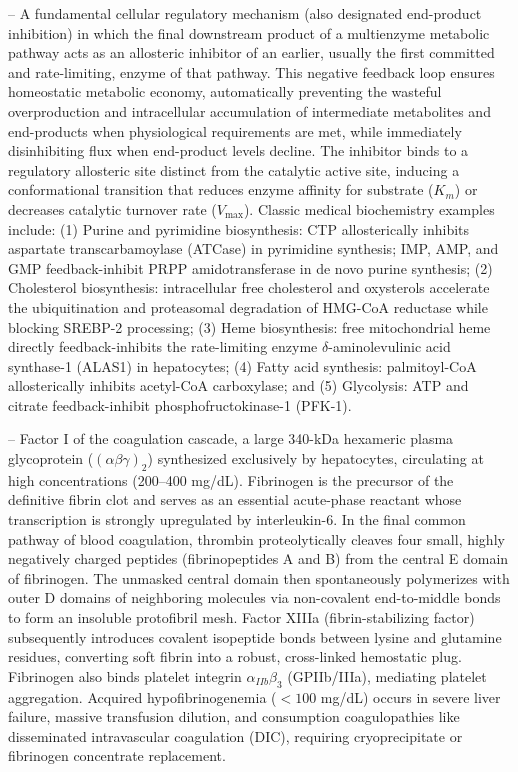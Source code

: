 -- A fundamental cellular regulatory mechanism (also designated end-product inhibition) in which the final downstream product of a multienzyme metabolic pathway acts as an allosteric inhibitor of an earlier, usually the first committed and rate-limiting, enzyme of that pathway. This negative feedback loop ensures homeostatic metabolic economy, automatically preventing the wasteful overproduction and intracellular accumulation of intermediate metabolites and end-products when physiological requirements are met, while immediately disinhibiting flux when end-product levels decline. The inhibitor binds to a regulatory allosteric site distinct from the catalytic active site, inducing a conformational transition that reduces enzyme affinity for substrate ($K_m$) or decreases catalytic turnover rate ($V_{\max}$). Classic medical biochemistry examples include: (1) Purine and pyrimidine biosynthesis: CTP allosterically inhibits aspartate transcarbamoylase (ATCase) in pyrimidine synthesis; IMP, AMP, and GMP feedback-inhibit PRPP amidotransferase in de novo purine synthesis; (2) Cholesterol biosynthesis: intracellular free cholesterol and oxysterols accelerate the ubiquitination and proteasomal degradation of HMG-CoA reductase while blocking SREBP-2 processing; (3) Heme biosynthesis: free mitochondrial heme directly feedback-inhibits the rate-limiting enzyme $\delta$-aminolevulinic acid synthase-1 (ALAS1) in hepatocytes; (4) Fatty acid synthesis: palmitoyl-CoA allosterically inhibits acetyl-CoA carboxylase; and (5) Glycolysis: ATP and citrate feedback-inhibit phosphofructokinase-1 (PFK-1).

-- Factor I of the coagulation cascade, a large 340-kDa hexameric plasma glycoprotein ($(\alpha\beta\gamma)_2$) synthesized exclusively by hepatocytes, circulating at high concentrations (200--400 mg/dL). Fibrinogen is the precursor of the definitive fibrin clot and serves as an essential acute-phase reactant whose transcription is strongly upregulated by interleukin-6. In the final common pathway of blood coagulation, thrombin proteolytically cleaves four small, highly negatively charged peptides (fibrinopeptides A and B) from the central E domain of fibrinogen. The unmasked central domain then spontaneously polymerizes with outer D domains of neighboring molecules via non-covalent end-to-middle bonds to form an insoluble protofibril mesh. Factor XIIIa (fibrin-stabilizing factor) subsequently introduces covalent isopeptide bonds between lysine and glutamine residues, converting soft fibrin into a robust, cross-linked hemostatic plug. Fibrinogen also binds platelet integrin $\alpha_{IIb}\beta_3$ (GPIIb/IIIa), mediating platelet aggregation. Acquired hypofibrinogenemia ($<100$ mg/dL) occurs in severe liver failure, massive transfusion dilution, and consumption coagulopathies like disseminated intravascular coagulation (DIC), requiring cryoprecipitate or fibrinogen concentrate replacement.

